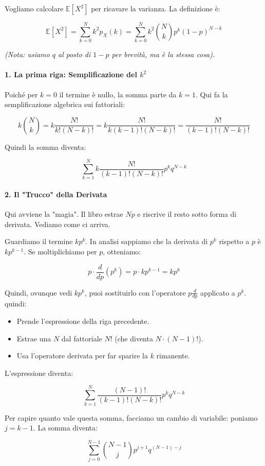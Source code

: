 Vogliamo calcolare $\mathbb{E}[X^2]$ per ricavare la varianza. La definizione è:

\[ \mathbb{E}[X^2] = \sum_{k=0}^{N} k^2 p_X(k) = \sum_{k=0}^{N} k^2 \binom{N}{k} p^k (1-p)^{N-k} \]

\textit{(Nota: usiamo $q$ al posto di $1-p$ per brevità, ma è la stessa cosa).}

\paragraph{1. La prima riga: Semplificazione del $k^2$}
Poiché per $k=0$ il termine è nullo, la somma parte da $k=1$. Qui fa la semplificazione algebrica sui fattoriali:

\[
k \binom{N}{k} = k \frac{N!}{k!(N-k)!} = k \frac{N!}{k(k-1)!(N-k)!} = \frac{N!}{(k-1)!(N-k)!}
\]

Quindi la somma diventa:

\[
\sum_{k=1}^{N} k \frac{N!}{(k-1)!(N-k)!} p^k q^{N-k}
\]

\paragraph{2. Il "Trucco" della Derivata}
Qui avviene la "magia". Il libro estrae $Np$ e riscrive il resto sotto forma di derivata. Vediamo come ci arriva.

Guardiamo il termine $k p^k$.
In analisi sappiamo che la derivata di $p^k$ rispetto a $p$ è $k p^{k-1}$.
Se moltiplichiamo per $p$, otteniamo:

\[
p \cdot \frac{d}{dp}(p^k) = p \cdot k p^{k-1} = k p^k
\]

Quindi, ovunque vedi $k p^k$, puoi sostituirlo con l'operatore $p \frac{d}{dp}$ applicato a $p^k$.
quindi:
\begin{itemize}
    \item Prende l'espressione della riga precedente.
    \item Estrae una $N$ dal fattoriale $N!$ (che diventa $N \cdot (N-1)!$).
    \item Usa l'operatore derivata per far sparire la $k$ rimanente.
\end{itemize}

L'espressione diventa:

\[
\sum_{k=1}^{N} \frac{(N-1)!}{(k-1)!(N-k)!} p^k q^{N-k}
\]

Per capire quanto vale questa somma, facciamo un cambio di variabile: poniamo $j = k-1$. La somma diventa:

\[
\sum_{j=0}^{N-1} \binom{N-1}{j} p^{j+1} q^{(N-1)-j}
\]

